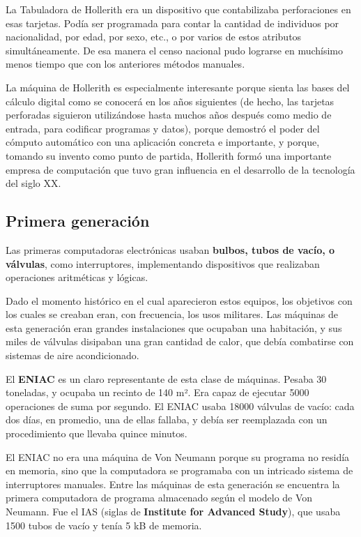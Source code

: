 \documentclass[spanish,a4paper,]{article}
\begin{document}
La Tabuladora de Hollerith era un dispositivo que contabilizaba
perforaciones en esas tarjetas. Podía ser programada para contar la
cantidad de individuos por nacionalidad, por edad, por sexo, etc., o por
varios de estos atributos simultáneamente. De esa manera el censo
nacional pudo lograrse en muchísimo menos tiempo que con los anteriores
métodos manuales.

La máquina de Hollerith es especialmente interesante porque sienta las
bases del cálculo digital como se conocerá en los años siguientes (de
hecho, las tarjetas perforadas siguieron utilizándose hasta muchos años
después como medio de entrada, para codificar programas y datos), porque
demostró el poder del cómputo automático con una aplicación concreta e
importante, y porque, tomando su invento como punto de partida,
Hollerith formó una importante empresa de computación que tuvo gran
influencia en el desarrollo de la tecnología del siglo XX.

\hypertarget{primera-generaciuxf3n}{%
\subsection{Primera generación}\label{primera-generaciuxf3n}}

Las primeras computadoras electrónicas usaban \textbf{bulbos, tubos de
vacío, o válvulas}, como interruptores, implementando dispositivos que
realizaban operaciones aritméticas y lógicas.

Dado el momento histórico en el cual aparecieron estos equipos, los
objetivos con los cuales se creaban eran, con frecuencia, los usos
militares. Las máquinas de esta generación eran grandes instalaciones
que ocupaban una habitación, y sus miles de válvulas disipaban una gran
cantidad de calor, que debía combatirse con sistemas de aire
acondicionado.

El \textbf{ENIAC} es un claro representante de esta clase de máquinas.
Pesaba 30 toneladas, y ocupaba un recinto de 140 m². Era capaz de
ejecutar 5000 operaciones de suma por segundo. El ENIAC usaba 18000
válvulas de vacío: cada dos días, en promedio, una de ellas fallaba, y
debía ser reemplazada con un procedimiento que llevaba quince minutos.

El ENIAC no era una máquina de Von Neumann porque su programa no residía
en memoria, sino que la computadora se programaba con un intricado
sistema de interruptores manuales. Entre las máquinas de esta generación
se encuentra la primera computadora de programa almacenado según el
modelo de Von Neumann. Fue el IAS (siglas de \textbf{Institute for
Advanced Study}), que usaba 1500 tubos de vacío y tenía 5 kB de memoria.
\end{document}
